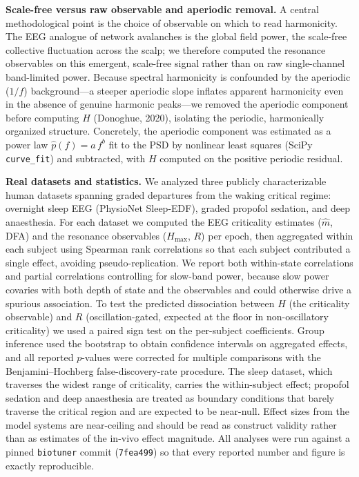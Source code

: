 \documentclass[11pt]{article}
\begin{document}
\textbf{Scale-free versus raw observable and aperiodic removal.} A central methodological point is the choice of observable on which to read harmonicity. The EEG analogue of network avalanches is the global field power, the scale-free collective fluctuation across the scalp; we therefore computed the resonance observables on this emergent, scale-free signal rather than on raw single-channel band-limited power. Because spectral harmonicity is confounded by the aperiodic ($1/f$) background---a steeper aperiodic slope inflates apparent harmonicity even in the absence of genuine harmonic peaks---we removed the aperiodic component before computing $H$ (Donoghue, 2020), isolating the periodic, harmonically organized structure. Concretely, the aperiodic component was estimated as a power law $\hat p(f)=a\,f^{b}$ fit to the PSD by nonlinear least squares (SciPy \texttt{curve\_fit}) and subtracted, with $H$ computed on the positive periodic residual.

\textbf{Real datasets and statistics.} We analyzed three publicly characterizable human datasets spanning graded departures from the waking critical regime: overnight sleep EEG (PhysioNet Sleep-EDF), graded propofol sedation, and deep anaesthesia. For each dataset we computed the EEG criticality estimates ($\hat m$, DFA) and the resonance observables ($H_{\max}$, $R$) per epoch, then aggregated within each subject using Spearman rank correlations so that each subject contributed a single effect, avoiding pseudo-replication. We report both within-state correlations and partial correlations controlling for slow-band power, because slow power covaries with both depth of state and the observables and could otherwise drive a spurious association. To test the predicted dissociation between $H$ (the criticality observable) and $R$ (oscillation-gated, expected at the floor in non-oscillatory criticality) we used a paired sign test on the per-subject coefficients. Group inference used the bootstrap to obtain confidence intervals on aggregated effects, and all reported $p$-values were corrected for multiple comparisons with the Benjamini--Hochberg false-discovery-rate procedure. The sleep dataset, which traverses the widest range of criticality, carries the within-subject effect; propofol sedation and deep anaesthesia are treated as boundary conditions that barely traverse the critical region and are expected to be near-null. Effect sizes from the model systems are near-ceiling and should be read as construct validity rather than as estimates of the in-vivo effect magnitude. All analyses were run against a pinned \texttt{biotuner} commit (\texttt{7fea499}) so that every reported number and figure is exactly reproducible.
\end{document}
